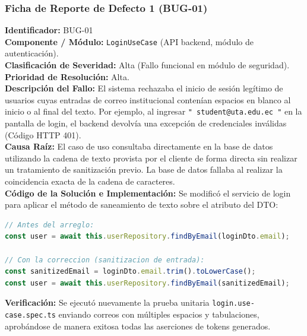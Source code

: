 \documentclass{article}
\begin{document}
\subsubsection*{Ficha de Reporte de Defecto 1 (BUG-01)}
\textbf{Identificador:} BUG-01\\
\textbf{Componente / Módulo:} \texttt{LoginUseCase} (API backend, módulo de autenticación).\\
\textbf{Clasificación de Severidad:} Alta (Fallo funcional en módulo de seguridad).\\
\textbf{Prioridad de Resolución:} Alta.\\
\textbf{Descripción del Fallo:} El sistema rechazaba el inicio de sesión legítimo de usuarios cuyas entradas de correo institucional contenían espacios en blanco al inicio o al final del texto. Por ejemplo, al ingresar \texttt{" student@uta.edu.ec "} en la pantalla de login, el backend devolvía una excepción de credenciales inválidas (Código HTTP 401).\\
\textbf{Causa Raíz:} El caso de uso consultaba directamente en la base de datos utilizando la cadena de texto provista por el cliente de forma directa sin realizar un tratamiento de sanitización previo. La base de datos fallaba al realizar la coincidencia exacta de la cadena de caracteres.\\
\textbf{Código de la Solución e Implementación:} Se modificó el servicio de login para aplicar el método de saneamiento de texto sobre el atributo del DTO:
\begin{lstlisting}[language=TypeScript]
// Antes del arreglo:
const user = await this.userRepository.findByEmail(loginDto.email);

// Con la correccion (sanitizacion de entrada):
const sanitizedEmail = loginDto.email.trim().toLowerCase();
const user = await this.userRepository.findByEmail(sanitizedEmail);
\end{lstlisting}
\textbf{Verificación:} Se ejecutó nuevamente la prueba unitaria \texttt{login.use-case.spec.ts} enviando correos con múltiples espacios y tabulaciones, aprobándose de manera exitosa todas las aserciones de tokens generados.
\end{document}
